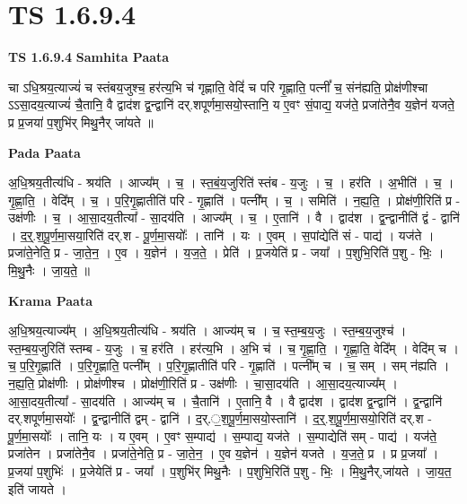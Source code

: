 \documentclass[17pt]{extarticle}
\begin{document}
\section*{ TS 1.6.9.4 }

\textbf{TS 1.6.9.4 } \newline
\textbf{Samhita Paata} \newline

चा ऽधि॒श्रय॒त्याज्यं॑ च स्तंबय॒जुश्च॒ हर॑त्य॒भि च॑ गृह्णाति॒ वेदिं॑ च परि गृ॒ह्णाति॒ पत्नीं᳚ च॒ संन॑ह्यति॒ प्रोक्ष॑णीश्चा ऽऽसा॒दय॒त्याज्यं॑ चै॒तानि॒ वै द्वाद॑श द्व॒न्द्वानि॑ दर्.शपूर्णमा॒सयो॒स्तानि॒ य ए॒वꣳ सं॒पाद्य॒ यज॑ते॒ प्रजा॑तेनै॒व य॒ज्ञेन॑ यजते॒ प्र प्र॒जया॑ प॒शुभि॑र् मिथु॒नैर् जा॑यते ॥ \newline

\textbf{Pada Paata} \newline

अ॒धि॒श्रय॒तीत्य॑धि - श्रय॑ति । आज्य᳚म् । च॒ । स्त॒बं॒य॒जुरिति॑ स्तंब - य॒जुः । च॒ । हर॑ति । अ॒भीति॑ । च॒ । गृ॒ह्णा॒ति॒ । वेदि᳚म् । च॒ । प॒रि॒गृ॒ह्णातीति॑ परि - गृ॒ह्णाति॑ । पत्नी᳚म् । च॒ । समिति॑ । न॒ह्य॒ति॒ । प्रोक्ष॑णी॒रिति॑ प्र - उक्ष॑णीः । च॒ । आ॒सा॒दय॒तीत्या᳚ - सा॒दय॑ति । आज्य᳚म् । च॒ । ए॒तानि॑ । वै । द्वाद॑श । द्व॒न्द्वानीति॑ द्वं - द्वानि॑ । द॒र्॒.श॒पू॒र्ण॒मा॒सया॒रिति॑ दर्.श - पू॒र्ण॒मा॒सयोः᳚ । तानि॑ । यः । ए॒वम् । स॒पांद्येति॑ सं - पाद्य॑ । यज॑ते । प्रजा॑ते॒नेति॒ प्र - जा॒ते॒न॒ । ए॒व । य॒ज्ञेन॑ । य॒ज॒ते॒ । प्रेति॑ । प्र॒जयेति॑ प्र - जया᳚ । प॒शुभि॒रिति॑ प॒शु - भिः॒ । मि॒थु॒नैः । जा॒य॒ते॒ ॥  \newline


\textbf{Krama Paata} \newline

अ॒धि॒श्रय॒त्याज्य᳚म् । अ॒धि॒श्रय॒तीत्य॑धि - श्रय॑ति । आज्य॑म् च । च॒ स्त॒म्ब॒य॒जुः । स्त॒म्ब॒य॒जुश्च॑ । स्त॒म्ब॒य॒जुरिति॑ स्तम्ब - य॒जुः । च॒ हर॑ति । हर॑त्य॒भि । अ॒भि च॑ । च॒ गृ॒ह्णा॒ति॒ । गृ॒ह्णा॒ति॒ वेदि᳚म् । वेदि॑म् च । च॒ प॒रि॒गृ॒ह्णाति॑ । प॒रि॒गृ॒ह्णाति॒ पत्नी᳚म् । प॒रि॒गृ॒ह्णातीति॑ परि - गृ॒ह्णाति॑ । पत्नी᳚म् च । च॒ सम् । सम् न॑ह्यति । न॒ह्य॒ति॒ प्रोक्ष॑णीः । प्रोक्ष॑णीश्च । प्रोक्ष॑णी॒रिति॑ प्र - उक्ष॑णीः । चा॒सा॒दय॑ति । आ॒सा॒दय॒त्याज्य᳚म् । आ॒सा॒दय॒तीत्या᳚ - सा॒दय॑ति । आज्य॑म् च । चै॒तानि॑ । ए॒तानि॒ वै । वै द्वाद॑श । द्वाद॑श द्व॒न्द्वानि॑ । द्व॒न्द्वानि॑ दर्.शपूर्णमा॒सयोः᳚ । द्व॒न्द्वानीति॑ द्वम् - द्वानि॑ । द॒र्.॒श॒पू॒र्ण॒मा॒सयो॒स्तानि॑ । द॒र्॒.श॒पू॒र्ण॒मा॒सयो॒रिति॑ दर्.श - पू॒र्ण॒मा॒सयोः᳚ । तानि॒ यः । य ए॒वम् । ए॒वꣳ स॒म्पाद्य॑ । स॒म्पाद्य॒ यज॑ते । स॒म्पाद्येति॑ सम् - पाद्य॑ । यज॑ते॒ प्रजा॑तेन । प्रजा॑तेनै॒व । प्रजा॑ते॒नेति॒ प्र - जा॒ते॒न॒ । ए॒व य॒ज्ञेन॑ । य॒ज्ञेन॑ यजते । य॒ज॒ते॒ प्र । प्र प्र॒जया᳚ । प्र॒जया॑ प॒शुभिः॑ । प्र॒जेयेति॑ प्र - जया᳚ । प॒शुभि॑र् मिथु॒नैः । प॒शुभि॒रिति॑ प॒शु - भिः॒ । मि॒थु॒नैर्,जा॑यते । जा॒य॒त॒ इति॑ जायते । \newline
\end{document}
